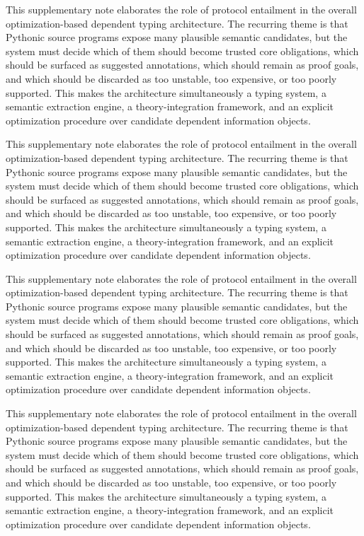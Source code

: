 \documentclass[11pt]{article}
\theoremstyle{definition}
\theoremstyle{plain}
\begin{document}
This supplementary note elaborates the role of protocol entailment in the overall
optimization-based dependent typing architecture. The recurring theme is that
Pythonic source programs expose many plausible semantic candidates, but the
system must decide which of them should become trusted core obligations, which
should be surfaced as suggested annotations, which should remain as proof
goals, and which should be discarded as too unstable, too expensive, or too
poorly supported. This makes the architecture simultaneously a typing system,
a semantic extraction engine, a theory-integration framework, and an explicit
optimization procedure over candidate dependent information objects.

This supplementary note elaborates the role of protocol entailment in the overall
optimization-based dependent typing architecture. The recurring theme is that
Pythonic source programs expose many plausible semantic candidates, but the
system must decide which of them should become trusted core obligations, which
should be surfaced as suggested annotations, which should remain as proof
goals, and which should be discarded as too unstable, too expensive, or too
poorly supported. This makes the architecture simultaneously a typing system,
a semantic extraction engine, a theory-integration framework, and an explicit
optimization procedure over candidate dependent information objects.

This supplementary note elaborates the role of protocol entailment in the overall
optimization-based dependent typing architecture. The recurring theme is that
Pythonic source programs expose many plausible semantic candidates, but the
system must decide which of them should become trusted core obligations, which
should be surfaced as suggested annotations, which should remain as proof
goals, and which should be discarded as too unstable, too expensive, or too
poorly supported. This makes the architecture simultaneously a typing system,
a semantic extraction engine, a theory-integration framework, and an explicit
optimization procedure over candidate dependent information objects.

This supplementary note elaborates the role of protocol entailment in the overall
optimization-based dependent typing architecture. The recurring theme is that
Pythonic source programs expose many plausible semantic candidates, but the
system must decide which of them should become trusted core obligations, which
should be surfaced as suggested annotations, which should remain as proof
goals, and which should be discarded as too unstable, too expensive, or too
poorly supported. This makes the architecture simultaneously a typing system,
a semantic extraction engine, a theory-integration framework, and an explicit
optimization procedure over candidate dependent information objects.
\end{document}
